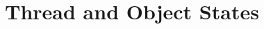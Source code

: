 \hypertarget{group__legacy__state}{\section{Thread and Object States}
\label{group__legacy__state}
}
